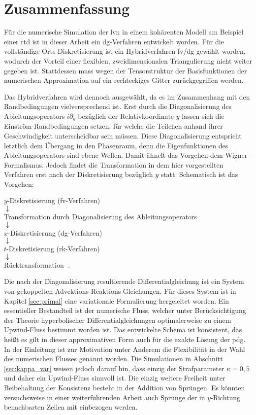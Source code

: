 \chapter{Zusammenfassung}
Für die numerische Simulation der \ac{lvn} in einem kohärenten Modell am Beispiel einer \ac{rtd} ist in dieser Arbeit ein \ac{dg}-Verfahren entwickelt worden. Für die vollständige Orts-Diskretisierung ist ein Hybridverfahren \ac{fv}/\ac{dg} gewählt worden, wodurch der Vorteil einer flexiblen, zweidimensionalen Triangulierung nicht weiter gegeben ist. Stattdessen muss wegen der Tensorstruktur der Basisfunktionen der numerischen Approximation auf ein rechteckiges Gitter zurückgegriffen werden.

Das Hybridverfahren wird dennoch ausgewählt, da es im Zusammenhang mit den Randbedingungen vielversprechend ist. Erst durch die Diagonalisierung des Ableitungsoperators $i\partial_y$ bezüglich der Relativkoordinate $y$ lassen sich die Einström-Randbedingungen setzen, für welche die Teilchen anhand ihrer Geschwindigkeit unterscheidbar sein müssen. Diese Diagonalisierung entspricht letztlich dem Übergang in den Phasenraum, denn die Eigenfunktionen des Ableitungsoperators sind ebene Wellen. Damit ähnelt das Vorgehen dem Wigner-Formalismus. Jedoch findet die Transformation in dem hier vorgestellten Verfahren erst nach der Diskretisierung bezüglich $y$ statt. Schematisch ist das Vorgehen:
\begin{center}
    $y$-Diskretisierung (\ac{fv}-Verfahren) \\
    $\downarrow$ \\
    Transformation durch Diagonalisierung des Ableitungsoperators \\
    $\downarrow$ \\
    $x$-Diskretisierung (\ac{dg}-Verfahren) \\
    $\downarrow$ \\
    $t$-Diskretisierung (\ac{rk}-Verfahren) \\
    $\downarrow$ \\
    Rücktransformation $\; .$
\end{center}
Die nach der Diagonalisierung resultierende Differentialgleichung ist ein System von gekoppelten Advektions-Reaktions-Gleichungen. Für dieses System ist in Kapitel \ref{sec:primal} eine variationale Formulierung hergeleitet worden. Ein essentieller Bestandteil ist der numerische Fluss, welcher unter Berücksichtigung der Theorie hyperbolischer Differentialgleichungen optimalerweise zu einem Upwind-Fluss bestimmt worden ist. Das entwickelte Schema ist konsistent, das heißt es gilt in dieser approximativen Form auch für die exakte Lösung der \ac{pdg}. In der Einleitung ist zur Motivation unter Anderem die Flexibilität in der Wahl des numerischen Flusses genannt worden. Die Simulationen in Abschnitt \ref{sec:kappa_var} weisen jedoch darauf hin, dass einzig der Strafparameter $\kappa=0,5$ und daher ein Upwind-Fluss sinnvoll ist. Die einzig weitere Freiheit unter Beibehaltung der Konsistenz besteht in der Addition von Sprüngen. Es könnten versuchsweise in einer weiterführenden Arbeit auch Sprünge der in $y$-Richtung benachbarten Zellen mit einbezogen werden.


